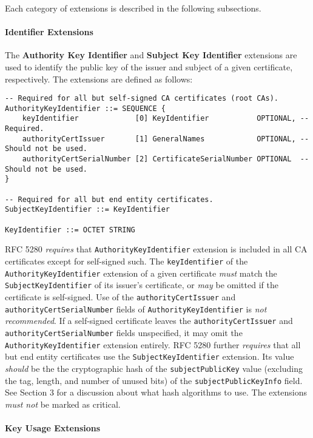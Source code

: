 Each category of extensions is described in the following subsections.

\paragraph{Identifier Extensions}

The \textbf{Authority Key Identifier} and \textbf{Subject Key Identifier} extensions are used to identify the public key of the issuer and subject of a given certificate, respectively.
The extensions are defined as follows:

\begin{verbatim}
-- Required for all but self-signed CA certificates (root CAs).
AuthorityKeyIdentifier ::= SEQUENCE {
    keyIdentifier             [0] KeyIdentifier           OPTIONAL, -- Required.
    authorityCertIssuer       [1] GeneralNames            OPTIONAL, -- Should not be used.
    authorityCertSerialNumber [2] CertificateSerialNumber OPTIONAL  -- Should not be used.
}

-- Required for all but end entity certificates.
SubjectKeyIdentifier ::= KeyIdentifier

KeyIdentifier ::= OCTET STRING
\end{verbatim}

RFC 5280 \textit{requires} that \texttt{AuthorityKeyIdentifier} extension is included in all CA certificates except for self-signed such.
The \texttt{keyIdentifier} of the \texttt{AuthorityKeyIdentifier} extension of a given certificate \textit{must} match the \texttt{SubjectKeyIdentifier} of its issuer's certificate, or \textit{may} be omitted if the certificate is self-signed.
Use of the \texttt{authorityCertIssuer} and \texttt{authorityCertSerialNumber} fields of \texttt{AuthorityKeyIdentifier} is \textit{not recommended}.
If a self-signed certificate leaves the \texttt{authorityCertIssuer} and \texttt{authorityCertSerialNumber} fields unspecified, it may omit the \texttt{AuthorityKeyIdentifier} extension entirely.
RFC 5280 further \textit{requires} that all but end entity certificates use the \texttt{SubjectKeyIdentifier} extension.
Its value \textit{should} be the the cryptographic hash of the \texttt{subjectPublicKey} value (excluding the tag, length, and number of unused bits) of the \texttt{subjectPublicKeyInfo} field.
See Section 3 for a discussion about what hash algorithms to use.
The extensions \textit{must not} be marked as critical.

\paragraph{Key Usage Extensions}

